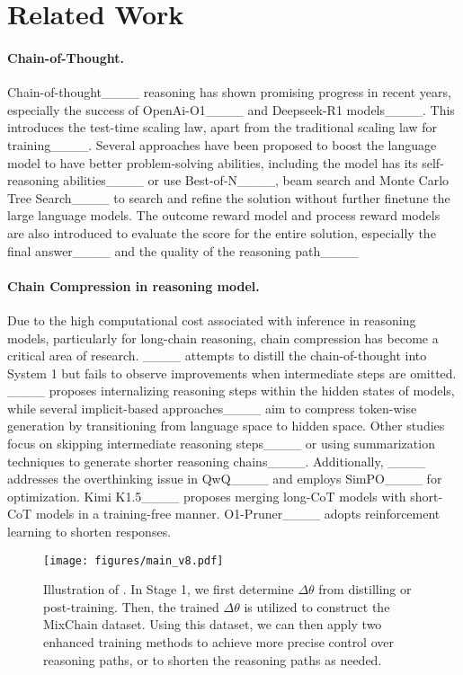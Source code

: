 \section{Related Work}
\paragraph{Chain-of-Thought.}
Chain-of-thought____ reasoning has shown promising progress in recent years, especially the success of OpenAi-O1____ and Deepseek-R1 models____. This introduces the test-time scaling law, apart from the traditional scaling law for training____. Several approaches have been proposed to boost the language model to have better problem-solving abilities, including the model has its self-reasoning abilities____ or use Best-of-N____, beam search and Monte Carlo Tree Search____ to search and refine the solution without further finetune the large language models. The outcome reward model and process reward models are also introduced to evaluate the score for the entire solution, especially the final answer____ and the 
quality of the reasoning path____

\paragraph{Chain Compression in reasoning model.} Due to the high computational cost associated with inference in reasoning models, particularly for long-chain reasoning, chain compression has become a critical area of research. ____ attempts to distill the chain-of-thought into System 1 but fails to observe improvements when intermediate steps are omitted. ____ proposes internalizing reasoning steps within the hidden states of models, while several implicit-based approaches____ aim to compress token-wise generation by transitioning from language space to hidden space. Other studies focus on skipping intermediate reasoning steps____ or using summarization techniques to generate shorter reasoning chains____.
Additionally, ____ addresses the overthinking issue in QwQ____ and employs SimPO____ for optimization. Kimi K1.5____ proposes merging long-CoT models with short-CoT models in a training-free manner. O1-Pruner____ adopts reinforcement learning to shorten responses.  


\begin{figure*}
    \centering
    \texttt{[image: figures/main\_v8.pdf]}
    \caption{Illustration of \methodname. In Stage 1, we first determine $\Delta\theta$ from distilling or post-training. Then, the trained $\Delta\theta$ is utilized to construct the MixChain dataset. Using this dataset, we can then apply two enhanced training methods to achieve more precise control over reasoning paths, or to shorten the reasoning paths as needed.}
    \label{fig:main}
\end{figure*}